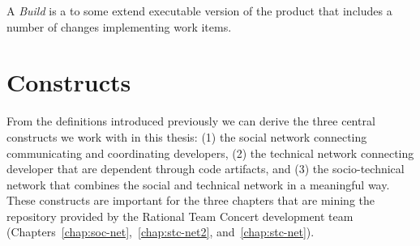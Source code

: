 \begin{note}
\begin{mydef}
A \emph{Build} is a to some extend executable version of the product that includes a number of changes implementing work items.
\end{mydef}
\end{note}

\section{Constructs}
\label{c5:sec:constructs}
From the definitions introduced previously we can derive the three central constructs we work with in this thesis: (1) the social network connecting communicating and coordinating developers, (2) the technical network connecting developer that are dependent through code artifacts, and (3) the socio-technical network that combines the social and technical network in a meaningful way.
These constructs are important for the three chapters that are mining the repository provided by the Rational Team Concert development team (Chapters~\ref{chap:soc-net},~\ref{chap:stc-net2}, and~\ref{chap:stc-net}).

